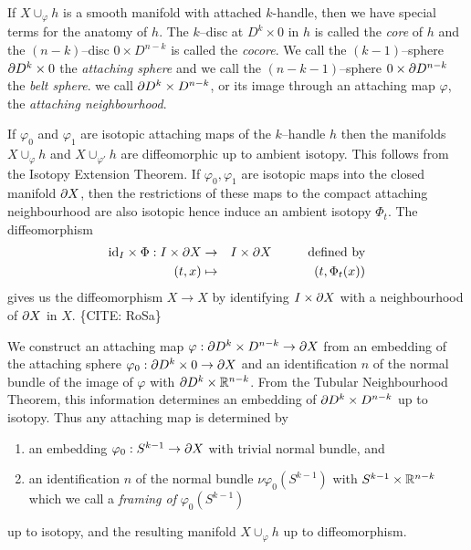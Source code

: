 If $X\cup_\varphi h$ is a smooth manifold with attached $k$-handle, then we have special terms for the anatomy of $h$.
The $k$--disc at $D^k\times 0$ in $h$ is called the \emph{core} of $h$ and the $(n-k)$--disc $0 \times D^{n-k}$ is called the \emph{cocore}.
We call the $(k-1)$--sphere $\partial D^k \times 0$ the \emph{attaching sphere} and we call the $(n-k-1)$--sphere $ 0 \times \partial D^{n-k}$ the \emph{belt sphere}.
we call $\partial D^k\times D^{n-k}$, or its image through an attaching map $\varphi$, the \emph{attaching neighbourhood}.

\begin{rmk}
If $\varphi_0$ and $\varphi_1$ are isotopic attaching maps of the $k$--handle $h$ then the manifolds $X\cup_\varphi h$ and $X\cup_{\varphi'} h$ are diffeomorphic up to ambient isotopy.
This follows from the Isotopy Extension Theorem.
If $\varphi_0,\varphi_1$ are isotopic maps into the closed manifold $\partial X$, then the restrictions of these maps to the compact attaching neighbourhood are also isotopic hence induce an ambient isotopy $\Phi_t$.
The diffeomorphism
\begin{eqnarray*}
  \ident{I}\times \Phi : I\times \pd X 
  & \to &
  I\times \pd X    \text{\hspace{10mm}defined by}  \\
  (t,x)
  & \mapsto &
  (t,\Phi_t(x))
\end{eqnarray*}
gives us the diffeomorphism $X\to X$ by identifying $I\times\partial X$ with a neighbourhood of $\partial X$ in $X$. \{CITE: RoSa\}

We construct an attaching map $\varphi:\partial D^k\times D^{n-k}\to\partial X$ from an embedding of the attaching sphere $\varphi_0:\partial D^k\times 0\to \partial X$ and an identification $n$ of the normal bundle of the image of $\varphi$ with $\partial D^k \times \mathbb{R}^{n-k}$.
From the Tubular Neighbourhood Theorem, this information determines an embedding of $\partial D^k\times D^{n-k}$ up to isotopy.
Thus any attaching map is determined by
\begin{enumerate}
  \item an embedding $\varphi_0:S^{k-1}\to\partial X$ with trivial normal bundle, and
  \item an identification $n$ of the normal bundle $\nu\varphi_0(S^{k-1})$ with $S^{k-1}\times\mathbb{R}^{n-k}$ which we call a \emph{framing of} $\varphi_0(S^{k-1})$
\end{enumerate}
up to isotopy, and the resulting manifold $X\cup_\varphi h$ up to diffeomorphism.
\end{rmk}


